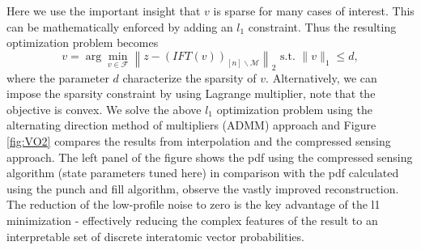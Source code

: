 \documentclass[final,onefignum,onetabnum]{siamart190516}
\begin{document}
Here we use the important insight that $v$ is sparse for many cases of interest. This can be mathematically enforced by adding an  $l_1$ constraint. Thus the resulting optimization problem becomes
\begin{equation}\label{eqn:complexopt}
    v = \arg\min_{v\in\mathcal{F}}\left\|z - \left(IFT(v)\right)_{[n]\backslash\mathcal{M}}\right\|_2 \text{ s.t. }\|v\|_1 \leq d,
\end{equation}
where the parameter $d$ characterize the sparsity of $v$. Alternatively, we can impose the sparsity constraint by using Lagrange multiplier, note that the objective is convex. We solve the above $l_1$ optimization problem using the alternating direction method of multipliers (ADMM)  approach and Figure \ref{fig:VO2} compares the results from interpolation and the compressed sensing approach. The left panel of the figure shows
the pdf using the compressed sensing algorithm (state parameters tuned here) in
comparison with the pdf calculated using the punch and fill algorithm, observe the vastly improved reconstruction. The reduction
of the low-profile noise to zero is the key advantage of the l1 minimization -
effectively reducing the complex features of the result to an interpretable set of
discrete interatomic vector probabilities. 
\end{document}
